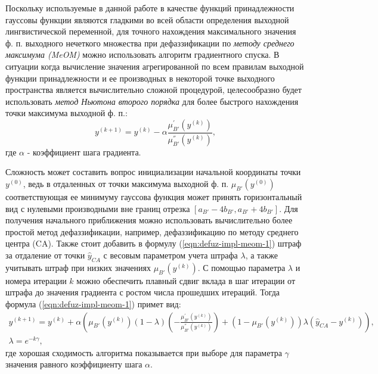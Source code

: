Поскольку используемые в данной работе в качестве функций принадлежности гауссовы функции являются гладкими во всей области определения выходной лингвистической переменной, для точного нахождения максимального значения ф. п. выходного нечеткого множества при дефаззификации по \textit{методу среднего максимума (MeOM)} можно использовать алгоритм градиентного спуска. В ситуации когда вычисление значения агрегированной по всем правилам выходной функции принадлежности и ее производных в некоторой точке выходного пространства является вычислительно сложной процедурой, целесообразно будет использовать \textit{метод Ньютона второго порядка} для более быстрого нахождения точки максимума выходной ф. п.:
\begin{equation}
	y^{(k+1)} = y^{(k)} - \alpha \frac{\mu_{B'}^{'}(y^{(k)})}{\mu_{B'}^{''}(y^{(k)})},
	\label{eqn:defuz-impl-meom-1}
\end{equation}
где $\alpha $ - коэффициент шага градиента.

Сложность может составить вопрос инициализации начальной координаты точки $y^{(0)}$, ведь в отдаленных от точки максимума выходной ф. п. $\mu_{B'}(y^{(0)})$  соответствующая ее минимуму гауссова функция может принять горизонтальный вид с нулевыми производными вне границ отрезка $[a_{B'} - 4 b_{B'}, a_{B'} + 4 b_{B'}]$. Для получения начального приближения можно использовать вычислительно более простой метод дефаззификации, например, дефаззификацию по методу среднего центра (CA). Также стоит добавить в формулу (\ref{eqn:defuz-impl-meom-1}) штраф за отдаление от точки $\hat{y}_{CA}$ с весовым параметром учета штрафа $\lambda$, а также учитывать штраф при низких значениях $\mu_{B'}(y^{(k)})$. С помощью параметра $\lambda$ и номера итерации $k$ можно обеспечить плавный сдвиг вклада в шаг итерации от штрафа до значения градиента с ростом числа прошедших итераций. Тогда формула (\ref{eqn:defuz-impl-meom-1}) примет вид:
\begin{gather*}
	y^{(k+1)} = y^{(k)} + \alpha \left(\mu_{B'}(y^{(k)})(1-\lambda)\left(-\frac{\mu_{B'}^{'}(y^{(k)})}{\mu_{B'}^{''}(y^{(k)})}\right) + (1-\mu_{B'}(y^{(k)}))\lambda (\hat{y}_{CA} - y^{(k)})\right),\\
	\lambda = e^{-k \gamma},
	\label{eqn:defuz-impl-meom-2}
\end{gather*}
где хорошая сходимость алгоритма показывается при выборе для параметра $\gamma$ значения равного коэффициенту шага $\alpha$.

